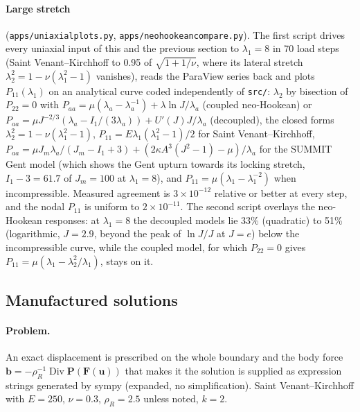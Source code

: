 \documentclass[11pt]{article}
\newcommand{\Dive}{\operatorname{Div}}
\newcommand{\bu}{\bm{u}}
\newcommand{\bP}{\bm{P}}
\newcommand{\bF}{\bm{F}}
\newcommand{\bb}{\bm{b}}
\DeclareRobustCommand{\file}[1]{{\def\_{\textunderscore\allowbreak}\texttt{#1}}}
\begin{document}
\paragraph{Large stretch} (\file{apps/uniaxial\_plots.py},
\file{apps/neo\_hookean\_compare.py}).  The first script drives every
uniaxial input of this and the previous section to $\lambda_1 = 8$ in 70
load steps (Saint Venant--Kirchhoff to 0.95 of $\sqrt{1 + 1/\nu}$, where its
lateral stretch $\lambda_2^2 = 1 - \nu(\lambda_1^2 - 1)$ vanishes), reads the
ParaView series back and plots $P_{11}(\lambda_1)$ on an analytical curve
coded independently of \file{src/}: $\lambda_2$ by bisection of
$P_{22} = 0$ with
$P_{aa} = \mu(\lambda_a - \lambda_a^{-1}) + \lambda\ln J/\lambda_a$ (coupled
neo-Hookean) or
$P_{aa} = \mu J^{-2/3}(\lambda_a - I_1/(3\lambda_a)) + U'(J)J/\lambda_a$
(decoupled), the closed forms $\lambda_2^2 = 1 - \nu(\lambda_1^2 - 1)$,
$P_{11} = E\lambda_1(\lambda_1^2 - 1)/2$ for Saint Venant--Kirchhoff,
$P_{aa} = \mu J_m\lambda_a/(J_m - I_1 + 3) + (2\kappa A^3(J^2-1) - \mu)/\lambda_a$
for the SUMMIT Gent model (which shows the Gent upturn towards its locking
stretch, $I_1 - 3 = 61.7$ of $J_m = 100$ at $\lambda_1 = 8$), and
$P_{11} = \mu(\lambda_1 - \lambda_1^{-2})$ when incompressible.  Measured
agreement is $3\times10^{-12}$ relative or better at every step, and the
nodal $P_{11}$ is uniform to $2\times10^{-11}$.  The second script overlays
the neo-Hookean responses: at $\lambda_1 = 8$ the decoupled models lie 33\%
(quadratic) to 51\% (logarithmic, $J = 2.9$, beyond the peak of $\ln J/J$
at $J = e$) below the incompressible curve, while the coupled model, for
which $P_{22} = 0$ gives $P_{11} = \mu(\lambda_1 - \lambda_2^2/\lambda_1)$,
stays on it.

\subsection{Manufactured solutions}

\paragraph{Problem.}
An exact displacement is prescribed on the whole boundary and the body
force $\bb = -\rho_R^{-1}\Dive\bP(\bF(\bu))$ that makes it the solution is
supplied as expression strings generated by sympy (expanded, no
simplification).  Saint Venant--Kirchhoff with $E = 250$, $\nu = 0.3$,
$\rho_R = 2.5$ unless noted, $k = 2$.
\end{document}
